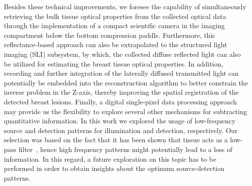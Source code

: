 Besides these technical improvements, we foresee the capability of simultaneously retrieving the bulk tissue optical properties from the collected optical data through the implementation of a compact scientific camera in the imaging compartment below the bottom compression paddle. Furthermore, this reflectance-based approach can also be extrapolated to the structured light imaging (SLI) subsystem, by which, the collected diffuse reflected light can also be utilized for estimating the breast tissue optical properties. In addition, recording and further integration of the laterally diffused transmitted light can potentially be embedded into the reconstruction algorithm to better constrain the inverse problem in the Z-axis, thereby improving the spatial registration of the detected breast lesions. Finally, a digital single-pixel data processing approach~\cite{Belanger2010,Pian2015} may provide us the flexibility to explore several other mechanisms for subtracting quantitative information. In this work we explored the usage of low-frequency source and detection patterns for illumination and detection, respectively. Our selection was based on the fact that it has been shown that tissue acts as a low-pass filter~\cite{OSullivan2012}, hence high frequency patterns might potentially lead to a loss of information. In this regard, a future exploration on this topic has to be performed in order to obtain insights about the optimum source-detection patterns.



